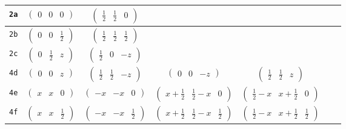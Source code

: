 \documentclass[fleqn,9pt,landscape]{jsarticle}
\begin{document}
\begin{center}
\begin{longtable}{ccccccc}
{\tt 2a} & $ \begin{pmatrix} 0 & 0 & 0 \end{pmatrix} $ & $ \begin{pmatrix} \frac{1}{2} & \frac{1}{2} & 0 \end{pmatrix} $ & $  $ & $  $ & $  $ & $  $ \\ \hline
{\tt 2b} & $ \begin{pmatrix} 0 & 0 & \frac{1}{2} \end{pmatrix} $ & $ \begin{pmatrix} \frac{1}{2} & \frac{1}{2} & \frac{1}{2} \end{pmatrix} $ & $  $ & $  $ & $  $ & $  $ \\ \hline
{\tt 2c} & $ \begin{pmatrix} 0 & \frac{1}{2} & z \end{pmatrix} $ & $ \begin{pmatrix} \frac{1}{2} & 0 & - z \end{pmatrix} $ & $  $ & $  $ & $  $ & $  $ \\ \hline
{\tt 4d} & $ \begin{pmatrix} 0 & 0 & z \end{pmatrix} $ & $ \begin{pmatrix} \frac{1}{2} & \frac{1}{2} & - z \end{pmatrix} $ & $ \begin{pmatrix} 0 & 0 & - z \end{pmatrix} $ & $ \begin{pmatrix} \frac{1}{2} & \frac{1}{2} & z \end{pmatrix} $ & $  $ & $  $ \\ \hline
{\tt 4e} & $ \begin{pmatrix} x & x & 0 \end{pmatrix} $ & $ \begin{pmatrix} - x & - x & 0 \end{pmatrix} $ & $ \begin{pmatrix} x + \frac{1}{2} & \frac{1}{2} - x & 0 \end{pmatrix} $ & $ \begin{pmatrix} \frac{1}{2} - x & x + \frac{1}{2} & 0 \end{pmatrix} $ & $  $ & $  $ \\ \hline
{\tt 4f} & $ \begin{pmatrix} x & x & \frac{1}{2} \end{pmatrix} $ & $ \begin{pmatrix} - x & - x & \frac{1}{2} \end{pmatrix} $ & $ \begin{pmatrix} x + \frac{1}{2} & \frac{1}{2} - x & \frac{1}{2} \end{pmatrix} $ & $ \begin{pmatrix} \frac{1}{2} - x & x + \frac{1}{2} & \frac{1}{2} \end{pmatrix} $ & $  $ & $  $ \\ \hline

\end{longtable}
\end{center}
\end{document}
